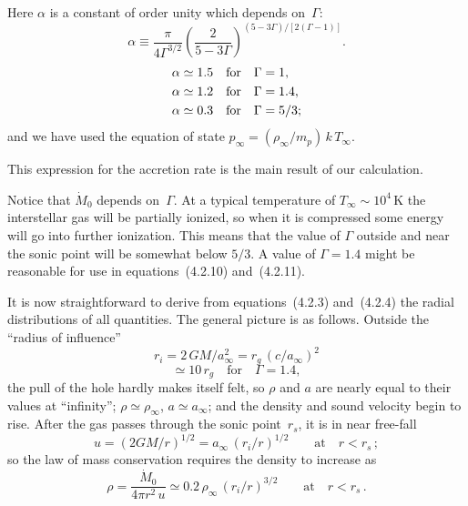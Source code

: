 Here $\alpha$ is a constant of order unity which depends on~$\Gamma$:
%
\begin{equation}
\alpha \equiv \frac{\pi}{4\Gamma^{3/2}}
  \left(\frac{2}{5-3\Gamma}\right)^{(5-3\Gamma)/[2(\Gamma-1)]}\!.
\tag{4.2.11}
\end{equation}
%
\begin{align}
\alpha &\simeq 1.5  \quad \text{for} \quad \Gamma = 1,    \notag \\
\alpha &\simeq 1.2  \quad \text{for} \quad \Gamma = 1.4,  \notag \\
\alpha &\simeq 0.3  \quad \text{for} \quad \Gamma = 5/3;
\end{align}
%
and we have used the equation of state
$p_\infty = (\rho_\infty / m_p)\,k\,T_\infty$.

This expression for the accretion rate is the main result of our calculation.

Notice that $\dot{M}_0$ depends on~$\Gamma$.  At a typical temperature of
$T_\infty \sim 10^4$\,K the interstellar gas will be partially ionized, so
when it is compressed some energy will go into further ionization.  This means
that the value of $\Gamma$ outside and near the sonic point will be somewhat
below $5/3$.  A value of $\Gamma = 1.4$ might be reasonable for use in
equations~(4.2.10) and~(4.2.11).

It is now straightforward to derive from equations~(4.2.3) and~(4.2.4) the
radial distributions of all quantities.  The general picture is as follows.
Outside the ``radius of influence''
%
\begin{equation}
r_i = 2\,GM/a_\infty^2 = r_g\,(c/a_\infty)^2
\tag{4.2.12}
\end{equation}
%
\[
\simeq 10\,r_g \quad \text{for} \quad \Gamma = 1.4,
\]
%
the pull of the hole hardly makes itself felt, so $\rho$ and $a$ are nearly
equal to their values at ``infinity''; $\rho \simeq \rho_\infty$,
$a \simeq a_\infty$; and the density and sound velocity begin to rise.
After the gas passes through the sonic point~$r_s$, it is in near free-fall
%
\begin{equation}
u = (2GM/r)^{1/2} = a_\infty\,(r_i/r)^{1/2}
\qquad \text{at} \quad r < r_s\,;
\tag{4.2.13a}
\end{equation}
%
so the law of mass conservation requires the density to increase as
%
\begin{equation}
\rho = \frac{\dot{M}_0}{4\pi r^2\,u}
\simeq 0.2\,\rho_\infty\,(r_i/r)^{3/2}
\qquad \text{at} \quad r < r_s\,.
\tag{4.2.13b}
\end{equation}

